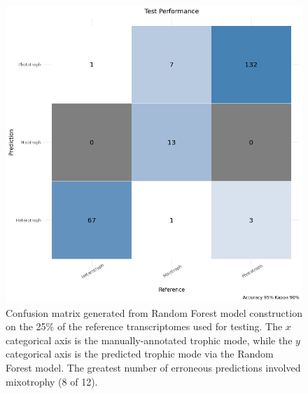 \documentclass[12pt]{article}
\numberwithin{equation}{section}
\begin{document}
\begin{figure}
    \centering
    \includegraphics[width=0.95\columnwidth]{si-figures/confusionmatrix.png}
    \caption{Confusion matrix generated from Random Forest model construction on the 25\% of the reference transcriptomes used for testing. The $x$ categorical axis is the manually-annotated trophic mode, while the $y$ categorical axis is the predicted trophic mode via the Random Forest model. The greatest number of erroneous predictions involved mixotrophy (8 of 12).}
    \label{fig:confusionmatrix}
\end{figure}
\end{document}
